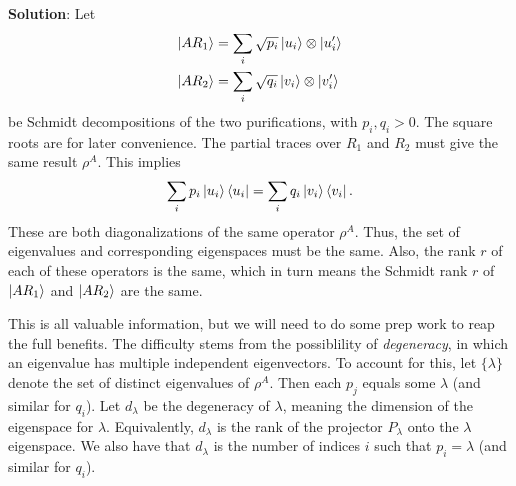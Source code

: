 \documentclass{book}
\begin{document}
    \textbf{Solution}: Let
    \begin{align}
    \begin{aligned}
        \ket{A R_1} &= \sum_i \sqrt{p_i} \ket{u_i}\otimes \ket{u_i'} \\
        \ket{A R_2} &= \sum_i \sqrt{q_i} \ket{v_i}\otimes \ket{v_i'}
    \end{aligned}
    \end{align}
    be Schmidt decompositions of the two purifications, with $p_i, q_i > 0$. The square roots are for later convenience. The partial traces over $R_1$ and $R_2$ must give the same result $\rho^A$. This implies
    \begin{align}
        \sum_i p_i \ket{u_i}\bra{u_i} = \sum_i q_i \ket{v_i}\bra{v_i}.
    \end{align}
    These are both diagonalizations of the same operator $\rho^A$. Thus, the set of eigenvalues and corresponding eigenspaces must be the same. Also, the rank $r$ of each of these operators is the same, which in turn means the Schmidt rank $r$ of $\ket{AR_1}$ and $\ket{AR_2}$ are the same.
    
    This is all valuable information, but we will need to do some prep work to reap the full benefits. The difficulty stems from the possiblility of \emph{degeneracy}, in which an eigenvalue has multiple independent eigenvectors. To account for this, let $\{\lambda\}$ denote the set of distinct eigenvalues of $\rho^A$. Then each $p_j$ equals some $\lambda$ (and similar for $q_i$). Let $d_{\lambda}$ be the degeneracy of $\lambda$, meaning the dimension of the eigenspace for $\lambda$. Equivalently, $d_\lambda$ is the rank of the projector $P_\lambda$ onto the $\lambda$ eigenspace. We also have that $d_\lambda$ is the number of indices $i$ such that $p_i = \lambda$ (and similar for $q_i$).
\end{document}
